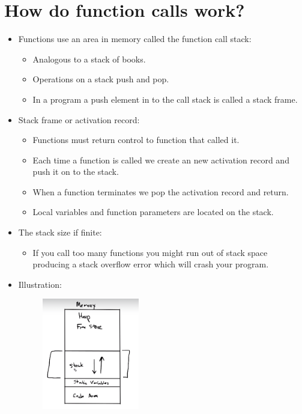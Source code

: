 \section{How do function calls work?}
\begin{itemize}
    \item Functions use an area in memory called the function call stack:
        \begin{itemize}
            \item Analogous to a stack of books.
            \item Operations on a stack push and pop.
            \item In a program a push element in to the call stack is called a stack frame.
        \end{itemize}
    
    \item Stack frame or activation record:
        \begin{itemize}
            \item Functions must return control to function that called it.
            \item Each time a function is called we create an new activation record and push it on to the stack.
            \item When a function terminates we pop the activation record and return.
            \item Local variables and function parameters are located on the stack.
        \end{itemize}
    
    \item The stack size if finite:
        \begin{itemize}
            \item If you call too many functions you might run out of stack space producing a stack overflow error which will crash your program.
        \end{itemize}
    
    \item Illustration:
        \begin{figure}[H]
            \centering
            \includegraphics[width=0.4\textwidth]{./figs/funcall.png}
        \end{figure}
\end{itemize}


